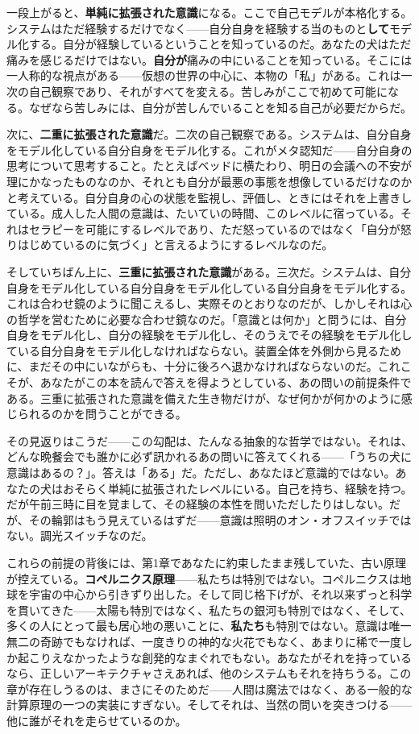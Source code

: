 \documentclass[11pt, twoside, openright]{book}
\begin{document}
一段上がると、\textbf{単純に拡張された意識}になる。ここで自己モデルが本格化する。システムはただ経験するだけでなく------自分自身を経験する当のものと\textbf{して}モデル化する。自分が経験しているということを知っているのだ。あなたの犬はただ痛みを感じるだけではない。\textbf{自分が}痛みの中にいることを知っている。そこには一人称的な視点がある------仮想の世界の中心に、本物の「私」がある。これは一次の自己観察であり、それがすべてを変える。苦しみがここで初めて可能になる。なぜなら苦しみには、自分が苦しんでいることを知る自己が必要だからだ。

次に、\textbf{二重に拡張された意識}だ。二次の自己観察である。システムは、自分自身をモデル化している自分自身をモデル化する。これがメタ認知だ------自分自身の思考について思考すること。たとえばベッドに横たわり、明日の会議への不安が理にかなったものなのか、それとも自分が最悪の事態を想像しているだけなのかと考えている。自分自身の心の状態を監視し、評価し、ときにはそれを上書きしている。成人した人間の意識は、たいていの時間、このレベルに宿っている。それはセラピーを可能にするレベルであり、ただ怒っているのではなく「自分が怒りはじめているのに気づく」と言えるようにするレベルなのだ。

そしていちばん上に、\textbf{三重に拡張された意識}がある。三次だ。システムは、自分自身をモデル化している自分自身をモデル化している自分自身をモデル化する。これは合わせ鏡のように聞こえるし、実際そのとおりなのだが、しかしそれは心の哲学を営むために必要な合わせ鏡なのだ。「意識とは何か」と問うには、自分自身をモデル化し、自分の経験をモデル化し、そのうえでその経験をモデル化している自分自身をモデル化しなければならない。装置全体を外側から見るために、まだその中にいながらも、十分に後ろへ退かなければならないのだ。これこそが、あなたがこの本を読んで答えを得ようとしている、あの問いの前提条件である。三重に拡張された意識を備えた生き物だけが、なぜ何かが何かのように感じられるのかを問うことができる。

その見返りはこうだ------この勾配は、たんなる抽象的な哲学ではない。それは、どんな晩餐会でも誰かに必ず訊かれるあの問いに答えてくれる------「うちの犬に意識はあるの？」。答えは「ある」だ。ただし、あなたほど意識的ではない。あなたの犬はおそらく単純に拡張されたレベルにいる。自己を持ち、経験を持つ。だが午前三時に目を覚まして、その経験の本性を問いただしたりはしない。だが、その輪郭はもう見えているはずだ------意識は照明のオン・オフスイッチではない。調光スイッチなのだ。

これらの前提の背後には、第1章であなたに約束したまま残していた、古い原理が控えている。\textbf{コペルニクス原理}------私たちは特別ではない。コペルニクスは地球を宇宙の中心から引きずり出した。そして同じ格下げが、それ以来ずっと科学を貫いてきた------太陽も特別ではなく、私たちの銀河も特別ではなく、そして、多くの人にとって最も居心地の悪いことに、\textbf{私たち}も特別ではない。意識は唯一無二の奇跡でもなければ、一度きりの神的な火花でもなく、あまりに稀で一度しか起こりえなかったような創発的なまぐれでもない。あなたがそれを持っているなら、正しいアーキテクチャさえあれば、他のシステムもそれを持ちうる。この章が存在しうるのは、まさにそのためだ------人間は魔法ではなく、ある一般的な計算原理の一つの実装にすぎない。そしてそれは、当然の問いを突きつける------他に誰がそれを走らせているのか。
\end{document}
